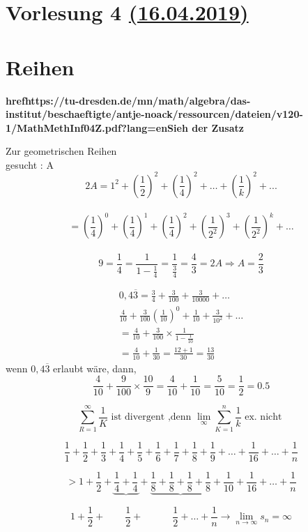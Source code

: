 


\section{Vorlesung 4 \href{https://tu-dresden.de/mn/math/algebra/das-institut/beschaeftigte/antje-noack/ressourcen/dateien/v120-1/MathMethInf04.pdf?lang=en}{(16.04.2019)} }
\section{Reihen}
\textbf{href{https://tu-dresden.de/mn/math/algebra/das-institut/beschaeftigte/antje-noack/ressourcen/dateien/v120-1/MathMethInf04Z.pdf?lang=en}{Sieh der Zusatz}}
\begin{example}{Zur geometrischen Reihen}\\
gesucht : A
\[2A = 1^2 + (\frac{1}{2})^2+(\frac{1}{4})^2 + \dots + (\frac{1}{k})^2 + ... \]\\
\[= (\frac{1}{4})^0 + (\frac{1}{4})^1+ (\frac{1}{4})^2+(\frac{1}{2^2})^3+(\frac{1}{2^2})^k+ \dots \]\\
\[9 = \frac{1}{4} = \frac{1}{1- \frac{1}{4}} = \frac{1}{\frac{3}{4}} = \frac{4}{3}= 2A \Rightarrow A = \frac{2}{3}\] 
\end{example}

\begin{example}
\begin{equation}
\begin{aligned}
0,4 \overline{3} = \frac{3}{4} + \frac{3}{100} + \frac{3}{10000}+ \dots \\
\frac{4}{10} + \frac{3}{100}(\frac{1}{10})^0 + \frac{1}{10} + \frac{3}{10^2} + \dots \\
=\frac{4}{10} + \frac{3}{100} \times \frac{1}{1-\frac{1}{10}}\\
= \frac{4}{10}+ \frac{1}{30} = \frac{12+1}{30}= \frac{13}{30}
\end{aligned}
\end{equation}
wenn $0,4 \overline{3}$ erlaubt wäre, dann,\\
\[\frac{4}{10} + \frac{9}{100} \times \frac{10}{9} = \frac{4}{10} + \frac{1}{10} = \frac{5}{10} = \frac{1}{2} = 0.5  \]
\end{example}

\newpage
\begin{example}
	\[\sum_{R=1}^{\infty} \frac{1}{K} \text{ ist divergent ,denn  } \lim\limits_{\infty} \sum_{K=1}^{n} \frac{1}{k} \text{ ex. nicht } \]
	
	\[\frac{1}{1}+\frac{1}{2}+\frac{1}{3}+\frac{1}{4}+\frac{1}{5}+\frac{1}{6}+\frac{1}{7}+\frac{1}{8}+\frac{1}{9}+\dots+\frac{1}{16}+\dots+\frac{1}{n}\]
	
	\[ > 1+\frac{1}{2}+  \underbrace{\frac{1}{4}+\frac{1}{4}}+\underbrace{\frac{1}{8}+\frac{1}{8}+\frac{1}{8}+\frac{1}{8}}+\frac{1}{10}+\frac{1}{16}+\dots+\frac{1}{n}\] 
	
	\[1+\frac{1}{2} + \qquad \frac{1}{2}+   \quad  \qquad \frac{1}{2}  + \dots + \frac{1}{n}  \rightarrow \lim\limits_{n\rightarrow \infty }s_n = \infty \]
	
\end{example}
